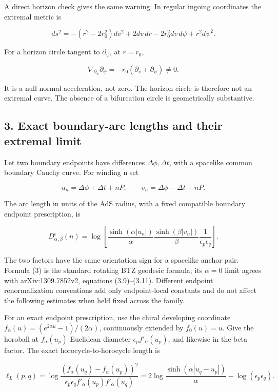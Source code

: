 \documentclass[11pt]{article}
\begin{document}
A direct horizon check gives the same warning. In regular ingoing
coordinates the extremal metric is

\[
ds^2=-(r^2-2r_0^2)dv^2+2dv\,dr-2r_0^2dv\,d\psi+r^2d\psi^2.
\]

For a horizon circle tangent to \(\partial_\psi\), at \(r=r_0\),

\[
\nabla_{\partial_\psi}\partial_\psi
=-r_0(\partial_v+\partial_\psi)\ne0.
\]

It is a null normal acceleration, not zero. The horizon circle is
therefore not an extremal curve. The absence of a bifurcation circle is
geometrically substantive.

\subsection{3. Exact boundary-arc lengths and their extremal
limit}\label{exact-boundary-arc-lengths-and-their-extremal-limit}

Let two boundary endpoints have differences \(\Delta\phi,\Delta t\),
with a spacelike common boundary Cauchy curve. For winding n set

\[
u_n=\Delta\phi+\Delta t+nP,\qquad
v_n=\Delta\phi-\Delta t+nP.
\]

The arc length in units of the AdS radius, with a fixed compatible
boundary endpoint prescription, is

\[
D_{\alpha,\beta}^{\epsilon}(n)
=\log\!\left[
\frac{\sinh(\alpha|u_n|)}{\alpha}
\frac{\sinh(\beta|v_n|)}{\beta}
\frac1{\epsilon_p\epsilon_q}
\right].
\tag{3}
\]

The two factors have the same orientation sign for a spacelike anchor
pair. Formula (3) is the standard rotating BTZ geodesic formula; its
\(\alpha=0\) limit agrees with arXiv:1309.7852v2, equations
(3.9)--(3.11). Different endpoint renormalization conventions add only
endpoint-local constants and do not affect the following estimates when
held fixed across the family.

For an exact endpoint prescription, use the chiral developing coordinate
\(f_\alpha(u)=(e^{2\alpha u}-1)/(2\alpha)\), continuously extended by
\(f_0(u)=u\). Give the horoball at \(f_\alpha(u_p)\) Euclidean diameter
\(\epsilon_p f'_\alpha(u_p)\), and likewise in the beta factor. The
exact horocycle-to-horocycle length is

\[
\ell_L(p,q)
=\log\frac{(f_\alpha(u_q)-f_\alpha(u_p))^2}
 {\epsilon_p\epsilon_q f'_\alpha(u_p)f'_\alpha(u_q)}
=2\log\frac{\sinh(\alpha|u_q-u_p|)}\alpha
-\log(\epsilon_p\epsilon_q).
\]
\end{document}

